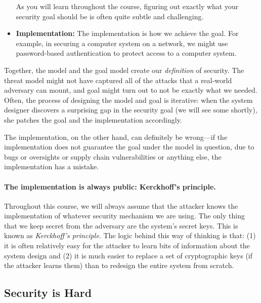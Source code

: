 \begin{itemize}
    As you will learn throughout the course, figuring out exactly what your
    security goal should be is often quite subtle and challenging.

  \item \textbf{Implementation:}
    The implementation is how we achieve the goal.
    For example, in securing a computer system on a network, we 
    might use password-based authentication to protect access to a computer system.
\end{itemize}

Together, the model and the goal model create our
\textit{definition} of security.
The threat model might not have captured all of
the attacks that a real-world adversary can mount,
and goal might turn out to
not be exactly what we needed.
Often, the process of designing the model and goal is iterative:
when the system designer discovers a surprising gap in the security
goal (we will see some shortly), she patches the goal and the implementation
accordingly.

The implementation, on the other hand, can definitely be wrong---if 
the implementation does not guarantee the goal
under the model in question, due to bugs or
oversights or supply chain vulnerabilities or
anything else, the implementation has a mistake.

\paragraph{The implementation is always public: Kerckhoff's principle.}
Throughout this course, we will always assume that the attacker knows
the implementation of whatever security mechanism we are using.
The only thing that we keep secret from the adversary are the system's
secret keys.
This is known as \emph{Kerckhoff's principle}.
The logic behind this way of thinking is that: (1) it is often
relatively easy for the attacker to learn bits of information 
about the system design and (2) it is much easier to replace
a set of cryptographic keys (if the attacker learns them) than
to redesign the entire system from scratch.


\subsection{Security is Hard}

